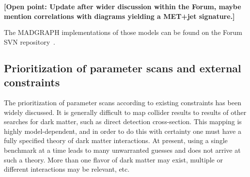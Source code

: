 \documentclass[a4,debug,notitlepage,nobib]{tufte-handout}
\begin{document}
\textbf{[Open point: Update after wider discussion within the Forum, 
maybe mention correlations with diagrams yielding a MET+jet signature.]}

The MADGRAPH implementations of those models can be found on the Forum SVN 
repository~\cite{ForumSVN_EWMonoHiggs}.




\subsection{Prioritization of parameter scans and external constraints}

The prioritization of parameter scans according to existing constraints 
has been widely discussed. It is generally difficult to map
collider results to results of other searches for dark matter, such as
direct detection cross-section. This mapping is highly
model-dependent, and in order to do this with certainty one must have
a fully specified theory of dark matter interactions. At present,
using a single benchmark at a time leads to many unwarranted guesses
and does not arrive at such a theory.  More than one flavor of dark
matter may exist, multiple or different interactions may be relevant,
etc.
\end{document}
